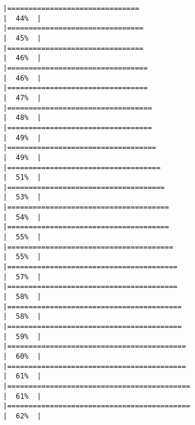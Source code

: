 \documentclass[
]{article}
\begin{document}
\begin{verbatim}
|===============================                                       |  44%  |                                                                              |================================                                      |  45%  |                                                                              |================================                                      |  46%  |                                                                              |=================================                                     |  46%  |                                                                              |=================================                                     |  47%  |                                                                              |==================================                                    |  48%  |                                                                              |==================================                                    |  49%  |                                                                              |===================================                                   |  49%  |                                                                              |====================================                                  |  51%  |                                                                              |=====================================                                 |  53%  |                                                                              |======================================                                |  54%  |                                                                              |======================================                                |  55%  |                                                                              |=======================================                               |  55%  |                                                                              |========================================                              |  57%  |                                                                              |========================================                              |  58%  |                                                                              |=========================================                             |  58%  |                                                                              |=========================================                             |  59%  |                                                                              |==========================================                            |  60%  |                                                                              |==========================================                            |  61%  |                                                                              |===========================================                           |  61%  |                                                                              |===========================================                           |  62%  |                                                                              
\end{verbatim}
\end{document}
